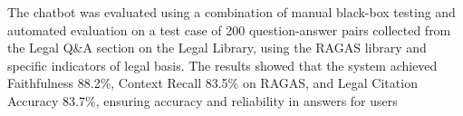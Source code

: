 \documentclass[../DoAn.tex]{subfiles}
\begin{document}
The chatbot was evaluated using a combination of manual black-box testing and automated evaluation on a test case of 200 question-answer pairs collected from the Legal Q\&A section on the Legal Library, using the RAGAS library and specific indicators of legal basis. The results showed that the system achieved Faithfulness 88.2\%, Context Recall 83.5\% on RAGAS, and Legal Citation Accuracy 83.7\%, ensuring accuracy and reliability in answers for users
\end{document}
